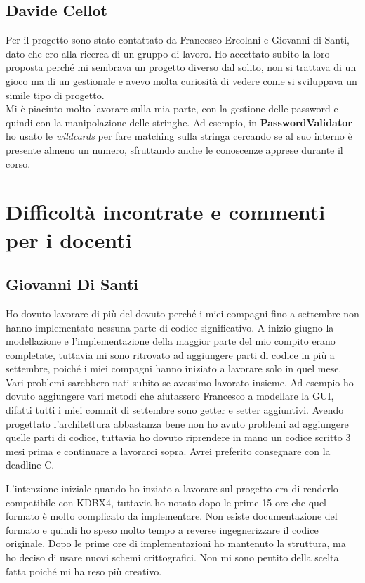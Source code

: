 \documentclass[a4paper,12pt]{report}
\begin{document}
\subsection*{Davide Cellot}
Per il progetto sono stato contattato da Francesco Ercolani e Giovanni di Santi, dato che ero alla ricerca di un gruppo di lavoro. Ho accettato subito la loro proposta perché mi sembrava un progetto diverso dal solito, non si trattava di un gioco ma di un gestionale e avevo molta curiosità di vedere come si sviluppava un simile tipo di progetto.\\

Mi è piaciuto molto lavorare sulla mia parte, con la gestione delle password e quindi con la manipolazione delle stringhe. Ad esempio, in \textbf{PasswordValidator} ho usato le \textit{wildcards} per fare matching sulla stringa cercando se al suo interno è presente almeno un numero, sfruttando anche le conoscenze apprese durante il corso.


\section{Difficoltà incontrate e commenti per i docenti}

\subsection*{Giovanni Di Santi}

Ho dovuto lavorare di più del dovuto perché i miei compagni fino a settembre
non hanno implementato nessuna parte di codice significativo.
A inizio giugno la modellazione e l'implementazione della maggior parte del mio
compito erano completate, tuttavia mi sono ritrovato ad aggiungere parti di 
codice in più a settembre, poiché i miei compagni hanno iniziato a lavorare
solo in quel mese. Vari problemi sarebbero nati subito se avessimo lavorato
insieme. Ad esempio ho dovuto aggiungere vari metodi che aiutassero Francesco a modellare
la GUI, difatti tutti i miei commit di settembre sono getter e setter aggiuntivi.
Avendo progettato l'architettura abbastanza bene non ho avuto problemi ad aggiungere
quelle parti di codice, tuttavia ho dovuto riprendere in mano un codice scritto 3 mesi
prima e continuare a lavorarci sopra. Avrei preferito consegnare con la deadline C.

L'intenzione iniziale quando ho inziato a lavorare sul progetto era di renderlo
compatibile con KDBX4, tuttavia ho notato dopo le prime 15 ore che quel formato
è molto complicato da implementare. Non esiste documentazione del formato e quindi
ho speso molto tempo a reverse ingegnerizzare il codice originale. Dopo le prime ore
di implementazioni ho mantenuto la struttura, ma ho deciso di usare nuovi schemi
crittografici. Non mi sono pentito della scelta fatta poiché mi ha reso più creativo.
\end{document}
